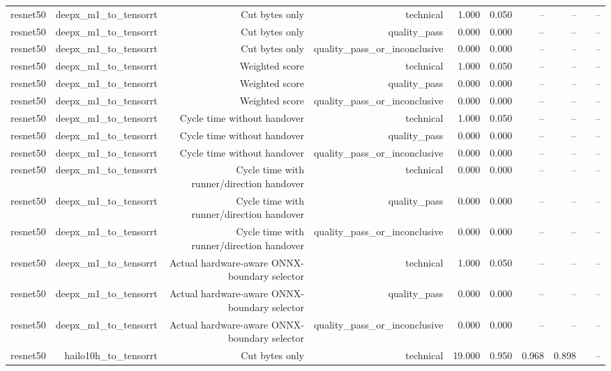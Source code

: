 \begin{table}[t]
\begin{tabular}{lrrrrrrrrr}
resnet50 & deepx\_m1\_to\_tensorrt & Cut bytes only & technical & 1.000 & 0.050 & -- & -- &  & -- \\
resnet50 & deepx\_m1\_to\_tensorrt & Cut bytes only & quality\_pass & 0.000 & 0.000 & -- & -- &  & -- \\
resnet50 & deepx\_m1\_to\_tensorrt & Cut bytes only & quality\_pass\_or\_inconclusive & 0.000 & 0.000 & -- & -- &  & -- \\
resnet50 & deepx\_m1\_to\_tensorrt & Weighted score & technical & 1.000 & 0.050 & -- & -- &  & -- \\
resnet50 & deepx\_m1\_to\_tensorrt & Weighted score & quality\_pass & 0.000 & 0.000 & -- & -- &  & -- \\
resnet50 & deepx\_m1\_to\_tensorrt & Weighted score & quality\_pass\_or\_inconclusive & 0.000 & 0.000 & -- & -- &  & -- \\
resnet50 & deepx\_m1\_to\_tensorrt & Cycle time without handover & technical & 1.000 & 0.050 & -- & -- &  & -- \\
resnet50 & deepx\_m1\_to\_tensorrt & Cycle time without handover & quality\_pass & 0.000 & 0.000 & -- & -- &  & -- \\
resnet50 & deepx\_m1\_to\_tensorrt & Cycle time without handover & quality\_pass\_or\_inconclusive & 0.000 & 0.000 & -- & -- &  & -- \\
resnet50 & deepx\_m1\_to\_tensorrt & Cycle time with runner/direction handover & technical & 0.000 & 0.000 & -- & -- &  & -- \\
resnet50 & deepx\_m1\_to\_tensorrt & Cycle time with runner/direction handover & quality\_pass & 0.000 & 0.000 & -- & -- &  & -- \\
resnet50 & deepx\_m1\_to\_tensorrt & Cycle time with runner/direction handover & quality\_pass\_or\_inconclusive & 0.000 & 0.000 & -- & -- &  & -- \\
resnet50 & deepx\_m1\_to\_tensorrt & Actual hardware-aware ONNX-boundary selector & technical & 1.000 & 0.050 & -- & -- &  & -- \\
resnet50 & deepx\_m1\_to\_tensorrt & Actual hardware-aware ONNX-boundary selector & quality\_pass & 0.000 & 0.000 & -- & -- &  & -- \\
resnet50 & deepx\_m1\_to\_tensorrt & Actual hardware-aware ONNX-boundary selector & quality\_pass\_or\_inconclusive & 0.000 & 0.000 & -- & -- &  & -- \\
resnet50 & hailo10h\_to\_tensorrt & Cut bytes only & technical & 19.000 & 0.950 & 0.968 & 0.898 &  & -- \\

\end{tabular}
\end{table}
